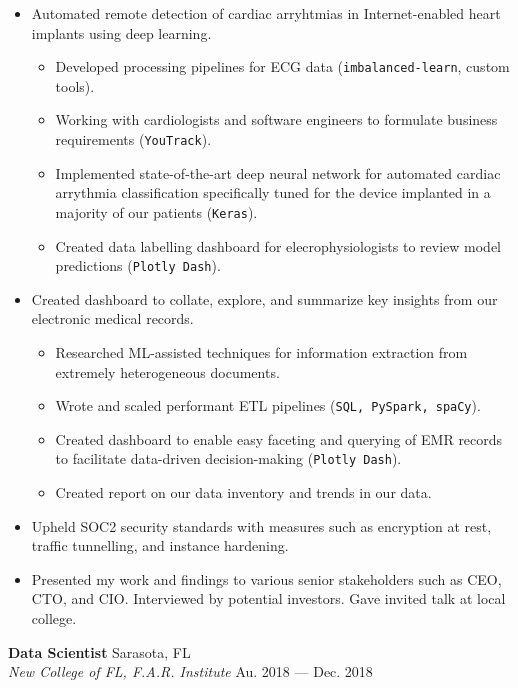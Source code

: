 \documentclass[a4paper,12pt]{article}
\newcommand{\ressubheading}[4]{{\begin{minipage}{\textwidth}
        \textbf{#1} \hfill #2 \\
        \textit{#3} \hfill #4 \\
        \end{minipage}}}
\begin{document}
\begin{itemize}

\item  Automated remote detection of cardiac arryhtmias in Internet-enabled heart implants using deep learning.
    \begin{itemize}
	\item Developed processing pipelines for ECG data (\texttt{imbalanced-learn}, custom tools).
    	\item Working with cardiologists and software engineers to formulate business requirements (\texttt{YouTrack}).
    	\item Implemented state-of-the-art deep neural network for automated cardiac arrythmia classification specifically tuned for the device implanted in a majority of our patients (\texttt{Keras}).
    	\item Created data labelling dashboard for elecrophysiologists  to review model predictions (\texttt{Plotly Dash}).
    \end{itemize}
    
\item Created dashboard to collate, explore, and summarize key insights from our electronic medical records.
    \begin{itemize}
        \item Researched ML-assisted techniques for information extraction from extremely heterogeneous documents.
    \item Wrote and scaled performant ETL pipelines (\texttt{SQL, PySpark, spaCy}).
    \item Created dashboard to enable easy faceting and querying of EMR records to facilitate data-driven decision-making (\texttt{Plotly Dash}).
    \item Created report on our data inventory and trends in our data.
    \end{itemize}


\item Upheld SOC2 security standards with measures such as encryption at rest, traffic tunnelling, and instance hardening.
\item Presented my work and findings to various senior stakeholders such as CEO, CTO, and CIO. Interviewed by potential investors. Gave invited talk at local college.

\end{itemize}


\ressubheading{Data Scientist}{Sarasota, FL}{New College of FL, F.A.R. Institute}{Au. 2018 --- Dec. 2018}
\end{document}
